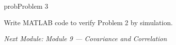\begin{PSbox}[unbreakable]{prob}{Problem 3}

Write MATLAB code to verify Problem 2 by simulation.

\PSsolution{} 


\begin{Shaded}
\begin{Highlighting}[]
 \OperatorTok{=} \OperatorTok{;}  \OperatorTok{=} \OperatorTok{;}  \OperatorTok{=} \OperatorTok{;}
 \OperatorTok{=} \NormalTok{(}\OperatorTok{,} \OperatorTok{,} \NormalTok{)}\OperatorTok{;}
 \OperatorTok{=} \NormalTok{(}\OperatorTok{,} \NormalTok{)}\OperatorTok{;}
\NormalTok{(}\OperatorTok{,} \NormalTok{(}\NormalTok{))}\OperatorTok{;}
\NormalTok{(}\OperatorTok{,} \NormalTok{(}\NormalTok{))}\OperatorTok{;}
\end{Highlighting}
\end{Shaded}

\emph{Next Module: {Module 9 — Covariance and Correlation}}

\end{PSbox}
